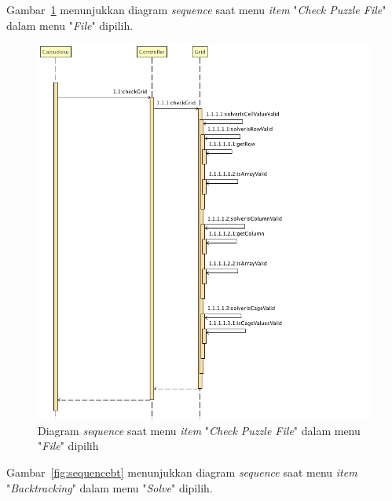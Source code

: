 Gambar~\ref{fig:sequencecheck} menunjukkan diagram \textit{sequence} saat menu \textit{item} "\textit{Check Puzzle File}" dalam menu "\textit{File}" dipilih.

\begin{figure}
\centering
\captionsetup{justification=centering}
\includegraphics[scale=0.5]{Gambar/Analisis/SequenceDiagramCheck.png}
\caption[Diagram \textit{sequence} saat menu \textit{item} "\textit{Check Puzzle File}" dalam menu "\textit{File}" dipilih]{Diagram \textit{sequence} saat menu \textit{item} "\textit{Check Puzzle File}" dalam menu "\textit{File}" dipilih}
\label{fig:sequencecheck}
\end{figure}

Gambar~\ref{fig:sequencebt} menunjukkan diagram \textit{sequence} saat menu \textit{item} "\textit{Backtracking}" dalam menu "\textit{Solve}" dipilih.

